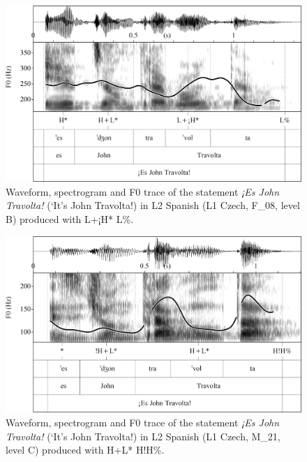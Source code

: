 \begin{figure}


\includegraphics[width=\textwidth]{figures/Figure_4.43.png}


\caption{Waveform, spectrogram and F0 trace of the statement \textit{¡Es John Travolta!} (‘It’s John Travolta!) in L2 Spanish (L1 Czech, F\_08, level B) produced with L+¡H* L\%.}
\label{fig:4.43}
\end{figure}

\begin{figure}


\includegraphics[width=\textwidth]{figures/Figure_4.44.png}


\caption{Waveform, spectrogram and F0 trace of the statement \textit{¡Es John Travolta!} (‘It’s John Travolta!) in L2 Spanish (L1 Czech, M\_21, level C) produced with H+L* H!H\%.}
\label{fig:4.44}
\end{figure}



